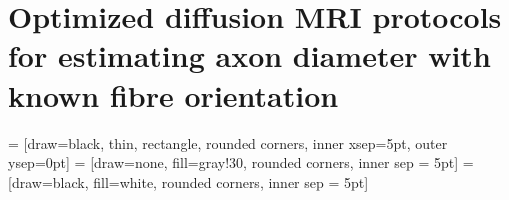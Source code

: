 \chapter[Diffusion MRI protocols for single fibre structures]{Optimized diffusion MRI protocols for estimating axon diameter with known fibre orientation}
 = [draw=black, thin, rectangle, rounded corners, inner xsep=5pt, outer ysep=0pt]  = [draw=none, fill=gray!30, rounded corners, inner sep = 5pt]  = [draw=black, fill=white, rounded corners, inner sep = 5pt]

\newcommand{\SF}{{\ensuremath{\mathcal{SF}}}}
\newcommand{\OI}{{\ensuremath{\mathcal{OI}}}}
\newcommand{\SD}{{\ensuremath{\mathcal{SF}_{pulses}}}}
\newcommand{\DO}{{\ensuremath{\mathcal{SF}_{dirs}}}}
\newcommand{\FD}{{\SF}}







%

